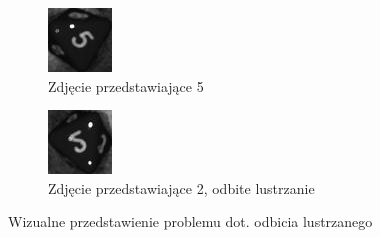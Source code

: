\begin{figure}[h]
    \centering
    \begin{subfigure}[t]{0.45\linewidth}
        \centering
        \includegraphics[width=\linewidth]{chapters/04-czytanie/figures/5_preprocessed}
        \caption{Zdjęcie przedstawiające 5}
        \label{fig:5_confusion}
    \end{subfigure}
    \hfill
    \begin{subfigure}[t]{0.45\linewidth}
        \centering
        \includegraphics[width=\linewidth]{chapters/04-czytanie/figures/2_mirror}
        \caption{Zdjęcie przedstawiające 2, odbite lustrzanie}
        \label{fig:2_confusion}
    \end{subfigure}
    \caption{Wizualne przedstawienie problemu dot. odbicia lustrzanego}
    \label{fig:25confusion}
\end{figure}
